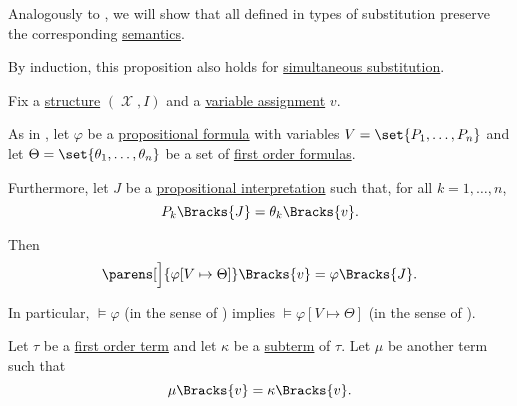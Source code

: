 \begin{proposition}\label{thm:first_order_substitution_equivalence}
  Analogously to , we will show that all defined in  types of substitution preserve the corresponding \hyperref[def:first_order_semantics]{semantics}.

  By induction, this proposition also holds for \hyperref[def:propositional_substitution/simultaneous]{simultaneous substitution}.

  Fix a \hyperref[def:first_order_structure]{structure} \( (\mscrX, I) \) and a \hyperref[def:first_order_valuation/variable_assignment]{variable assignment} \( v \).

  \begin{propenum}
     As in , let \( \varphi \) be a \hyperref[def:propositional_syntax/formula]{propositional formula} with variables \( {V = \set{ P_1, \ldots, P_n }} \) and let \( \Theta = \set{ \theta_1, \ldots, \theta_n } \) be a set of \hyperref[def:first_order_syntax/formula]{first order formulas}.

    Furthermore, let \( J \) be a \hyperref[def:propositional_valuation/interpretation]{propositional interpretation} such that, for all \( k = 1, \ldots, n \),
    \begin{equation}\label{eq:thm:first_order_substitution_equivalence/propositional/compatibility}
      P_k\Bracks{J} = \theta_k\Bracks{v}.
    \end{equation}

    Then
    \begin{equation}\label{eq:thm:first_order_substitution_equivalence/propositional}
      \parens[\Big]{ \varphi[V \mapsto \Theta] }\Bracks{v} = \varphi \Bracks{J}.
    \end{equation}

    In particular, \( \vDash \varphi \) (in the sense of ) implies \( \vDash \varphi[V \mapsto \Theta] \) (in the sense of ).

     Let \( \tau \) be a \hyperref[def:first_order_syntax/term]{first order term} and let \( \kappa \) be a \hyperref[def:first_order_syntax/subterm]{subterm} of \( \tau \). Let \( \mu \) be another term such that
    \begin{equation}\label{eq:thm:first_order_substitution_equivalence/term_in_term/compatibility}
      \mu\Bracks{v} = \kappa\Bracks{v}.
    \end{equation}


\end{propenum}
\end{proposition}
